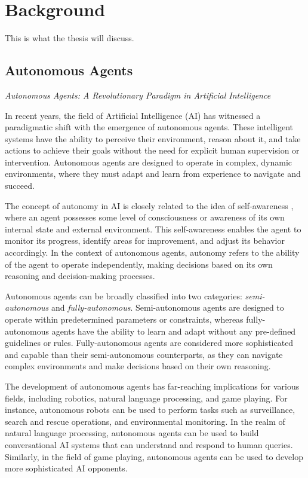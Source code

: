\chapter{Background}

This is what the thesis will discuss.

\section{Autonomous Agents}
\textit{Autonomous Agents: A Revolutionary Paradigm in Artificial Intelligence }

In recent years, the field of Artificial Intelligence (AI) has witnessed a paradigmatic
shift with the emergence of autonomous agents. These intelligent systems have
the ability to perceive their environment, reason about it, and take actions to
achieve their goals without the need for explicit human supervision or
intervention. Autonomous agents are designed to operate in complex, dynamic
environments, where they must adapt and learn from experience to navigate and succeed.

The concept of autonomy in AI is closely related to the idea of self-awareness ,
where an agent possesses some level of consciousness or awareness of its own internal
state and external environment. This self-awareness enables the agent to monitor
its progress, identify areas for improvement, and adjust its behavior
accordingly. In the context of autonomous agents, autonomy refers to the ability
of the agent to operate independently, making decisions based on its own reasoning
and decision-making processes.

Autonomous agents can be broadly classified into two categories: \textit{semi-autonomous}
and \textit{fully-autonomous}. Semi-autonomous agents are designed to operate within
predetermined parameters or constraints, whereas fully-autonomous agents have
the ability to learn and adapt without any pre-defined guidelines or rules. Fully-autonomous
agents are considered more sophisticated and capable than their semi-autonomous counterparts,
as they can navigate complex environments and make decisions based on their own
reasoning.

The development of autonomous agents has far-reaching implications for various
fields, including robotics, natural language processing, and game playing. For
instance, autonomous robots can be used to perform tasks such as surveillance,
search and rescue operations, and environmental monitoring. In the realm of
natural language processing, autonomous agents can be used to build conversational
AI systems that can understand and respond to human queries. Similarly, in the field
of game playing, autonomous agents can be used to develop more sophisticated AI
opponents.

